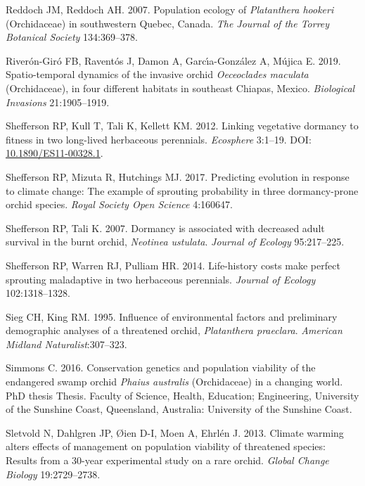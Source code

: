 \documentclass[
  12pt,
  letterpaper,
]{book}
\newlength{\cslhangindent}
\newenvironment{CSLReferences}[2] %
 {\begin{list}{}{%
  \setlength{\itemindent}{0pt}
  \setlength{\leftmargin}{0pt}
  \setlength{\parsep}{0pt}
  \ifodd #1
   \setlength{\leftmargin}{\cslhangindent}
   \setlength{\itemindent}{-1\cslhangindent}
  \fi
  \setlength{\itemsep}{#2\baselineskip}}}
 {\end{list}}
\begin{document}
\begin{CSLReferences}{1}{0}
Reddoch JM, Reddoch AH. 2007. Population ecology of \emph{{P}latanthera
{h}ookeri} ({O}rchidaceae) in southwestern {Q}uebec, {C}anada. \emph{The
Journal of the Torrey Botanical Society} 134:369--378.

Riverón-Giró FB, Raventós J, Damon A, Garcı́a-González A, Mújica E. 2019.
Spatio-temporal dynamics of the invasive orchid \emph{{O}eceoclades
{m}aculata} ({O}rchidaceae), in four different habitats in southeast
{C}hiapas, {M}exico. \emph{Biological Invasions} 21:1905--1919.

Shefferson RP, Kull T, Tali K, Kellett KM. 2012. Linking vegetative
dormancy to fitness in two long-lived herbaceous perennials.
\emph{Ecosphere} 3:1--19. DOI:
\href{https://doi.org/10.1890/ES11-00328.1}{10.1890/ES11-00328.1}.

Shefferson RP, Mizuta R, Hutchings MJ. 2017. Predicting evolution in
response to climate change: The example of sprouting probability in
three dormancy-prone orchid species. \emph{Royal Society Open Science}
4:160647.

Shefferson RP, Tali K. 2007. Dormancy is associated with decreased adult
survival in the burnt orchid, \emph{{N}eotinea {u}stulata}.
\emph{Journal of Ecology} 95:217--225.

Shefferson RP, Warren RJ, Pulliam HR. 2014. Life-history costs make
perfect sprouting maladaptive in two herbaceous perennials.
\emph{Journal of Ecology} 102:1318--1328.

Sieg CH, King RM. 1995. Influence of environmental factors and
preliminary demographic analyses of a threatened orchid,
\emph{{P}latanthera {p}raeclara}. \emph{American Midland
Naturalist}:307--323.

Simmons C. 2016. Conservation genetics and population viability of the
endangered swamp orchid \emph{{P}haius {a}ustralis} ({O}rchidaceae) in a
changing world. PhD thesis Thesis. Faculty of Science, Health,
Education; Engineering, University of the Sunshine Coast, Queensland,
Australia: University of the Sunshine Coast.

Sletvold N, Dahlgren JP, Øien D-I, Moen A, Ehrlén J. 2013. Climate
warming alters effects of management on population viability of
threatened species: Results from a 30-year experimental study on a rare
orchid. \emph{Global Change Biology} 19:2729--2738.


\end{CSLReferences}
\end{document}
